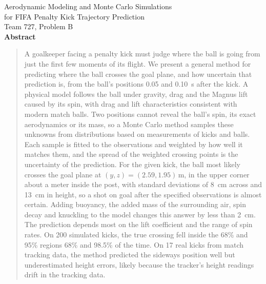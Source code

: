 \documentclass[10pt,a4paper]{article}
\newcommand{\teamnumber}{727}
\newcommand{\problemletter}{B}
\begin{document}
\begin{center}
  \vspace*{3cm}
  {\LARGE Aerodynamic Modeling and Monte Carlo Simulations\\[4pt]
   for FIFA Penalty Kick Trajectory Prediction}\\[1.5cm]
  {\large Team \teamnumber, Problem \problemletter}\\[1.5cm]
  {\bfseries Abstract}
\end{center}

\begin{quote}
  \small
  A goalkeeper facing a penalty kick must judge where the ball is going from just the first few moments of its flight. We present a general method for predicting where the ball crosses the
  goal plane, and how uncertain that prediction is, from the ball's positions
  \SI{0.05}{} and \SI{0.10}{\second} after the kick. A physical model follows
  the ball under gravity, drag and the Magnus lift caused by its spin, with
  drag and lift characteristics consistent with modern match balls. Two positions
  cannot reveal the ball's spin, its exact aerodynamics or its mass, so a
  Monte Carlo method samples these unknowns from distributions based on
  measurements of kicks and balls. Each sample is fitted to the observations
  and weighted by how well it matches them, and the spread of the weighted
  crossing points is the uncertainty of the prediction. For the given kick, the ball most likely crosses the goal plane at $(y, z) = (2.59, 1.95)$\,\si{\metre}, in the upper corner about a meter
  inside the post, with standard deviations of \SI{8}{\centi\metre} across
  and \SI{13}{\centi\metre} in height, so a shot on goal after the specified observations is almost certain. Adding buoyancy, the
  added mass of the surrounding air, spin decay and knuckling to the model
  changes this answer by less than \SI{2}{\centi\metre}. The prediction depends most on the lift coefficient
  and the range of spin rates. On 200 simulated kicks, the true crossing fell
  inside the 68\% and 95\% regions 68\% and 98.5\% of the time. On 17 real
  kicks from match tracking data, the method predicted the sideways position
  well but underestimated height errors, likely because the tracker's height
  readings drift in the tracking data.
\end{quote}
\end{document}
